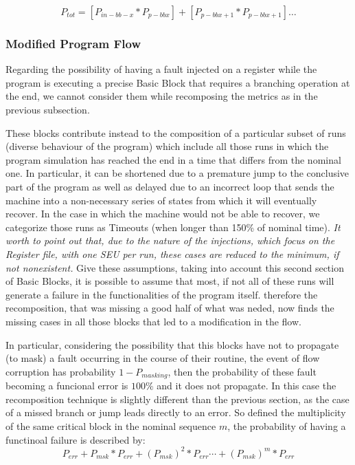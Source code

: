 \documentclass[./dissertation.tex]{subfiles}
\begin{document}
\begin{equation}
    P_{tot} = [P_{in-bb-x} * P_{p-bbx}] + [P_{p-bbx+1} * P_{p-bbx+1}]  \dots
\end{equation}
\subsubsection{Modified Program Flow}
Regarding the possibility of having a fault injected on a register while the program is executing a precise Basic Block that requires a branching operation at the end, we cannot consider them while recomposing the metrics as in the previous subsection.

These blocks contribute instead to the composition of a particular subset of runs (diverse behaviour of the program) which include all those runs in which the program simulation has reached the end in a time that differs from the nominal one. In particular, it can be shortened due to a premature jump to the conclusive part of the program as well as delayed due to an incorrect loop that sends the machine into a non-necessary series of states from which it will eventually recover. In the case in which the machine would not be able to recover, we categorize those runs as Timeouts (when longer than 150\% of nominal time).\textit{ It worth to point out that, due to the nature of the injections, which focus on the Register file, with one SEU per run, these cases are reduced to the minimum, if not nonexistent.}
Give these assumptions, taking into account this second section of Basic Blocks, it is possible to assume that most, if not all of these runs will generate a failure in the functionalities of the program itself. therefore the recomposition, that was missing a good half of what was neded, now finds the missing cases in all those blocks that led to a modification in the flow.

In particular, considering the possibility that this blocks have not to propagate (to mask) a fault occurring in the course of their routine, the event of flow corruption has probability $1 - P_{masking}$, then the probability of these fault becoming a funcional error is $100\%$ and it does not propagate.
In this case the recomposition technique is slightly different than the previous section, as the case of a missed branch or jump leads directly to an error. So defined the multiplicity of the same critical block in the nominal sequence $m$, the probability of having a functinoal failure is described by:
\begin{equation}
    P_{err} + P_{msk} * P_{err} + (P_{msk})^{2} * P_{err} \cdots + (P_{msk})^m * P_{err}
\end{equation}
\end{document}
